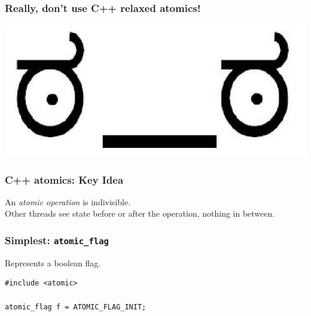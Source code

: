 \begin{frame}[fragile]
  \frametitle{Really, don't use C++ relaxed atomics!}
  \begin{center}
    \includegraphics[width=.8\textwidth]{images/look_of_disapproval}
  \end{center}
\end{frame}

\begin{frame}[fragile]
  \frametitle{C++ atomics: Key Idea}
  
    An \emph{atomic operation} is indivisible.\\[1em]
    Other threads see state before or after the operation,
    nothing in between.
  
\end{frame}

\begin{frame}[fragile]
  \frametitle{Simplest: {\tt atomic\_flag}}
  
    Represents a boolean flag.\\[1em]
    \begin{lstlisting}
#include <atomic>

atomic_flag f = ATOMIC_FLAG_INIT;
    \end{lstlisting}
  
\end{frame}

